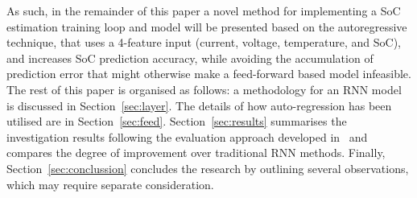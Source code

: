%
%
As such, in the remainder of this paper a novel method for implementing a SoC estimation training loop and model will be presented based on the autoregressive technique, that uses a 4-feature input (current, voltage, temperature, and SoC), and increases SoC prediction accuracy, while avoiding the accumulation of prediction error that might otherwise make a feed-forward based model infeasible.
The rest of this paper is organised as follows: a methodology for an RNN model is discussed in Section~\ref{sec:layer}.
The details of how auto-regression has been utilised are in Section~\ref{sec:feed}.
Section~\ref{sec:results} summarises the investigation results following the evaluation approach developed in~\cite{sadykov_practical_2022} and compares the degree of improvement over traditional RNN methods.
Finally, Section~\ref{sec:conclussion} concludes the research by outlining several observations, which may require separate consideration.
